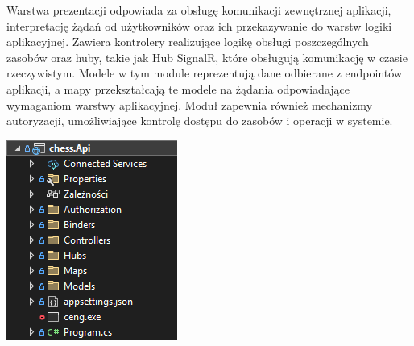 \documentclass[12pt,a4paper]{article}
\begin{document}
\vspace{0.5cm}
\begin{minipage}[t]{0.45\textwidth}
    \vspace{0pt}
    \raggedright
    Warstwa prezentacji odpowiada za obsługę komunikacji zewnętrznej aplikacji, interpretację żądań od użytkowników oraz ich przekazywanie do warstw logiki aplikacyjnej. Zawiera kontrolery realizujące logikę obsługi poszczególnych zasobów oraz huby, takie jak Hub SignalR, które obsługują komunikację w czasie rzeczywistym. Modele w tym module reprezentują dane odbierane z endpointów aplikacji, a mapy przekształcają te modele na żądania odpowiadające wymaganiom warstwy aplikacyjnej. Moduł zapewnia również mechanizmy autoryzacji, umożliwiające kontrolę dostępu do zasobów i operacji w systemie.
\end{minipage}
\hfill
\begin{minipage}[t]{0.45\textwidth}
    \vspace{0pt}
    \centering
    \includegraphics[width=\linewidth]{images/struktura_back_api.png}
\end{minipage}
\vspace{0.5cm}
\end{document}
